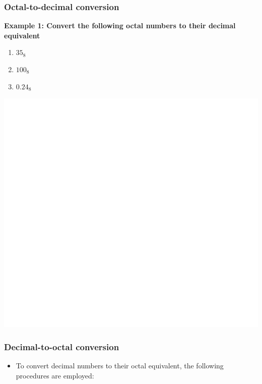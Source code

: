 \documentclass[]{book}
\providecommand{\tightlist}{%
  \setlength{\itemsep}{0pt}\setlength{\parskip}{0pt}}
\begin{document}
\hypertarget{octal-to-decimal-conversion}{%
\subsubsection{Octal-to-decimal conversion}\label{octal-to-decimal-conversion}}

\textbf{Example 1: Convert the following octal numbers to their decimal equivalent}

\begin{enumerate}
\def\labelenumi{(\alph{enumi})}
\tightlist
\item
  \(35_8\)
\item
  \(100_8\)
\item
  \(0.24_8\)
\end{enumerate}

\begin{center}\includegraphics[width=1\linewidth]{figure/NSbox9-1} \end{center}

\hypertarget{decimal-to-octal-conversion}{%
\subsubsection{Decimal-to-octal conversion}\label{decimal-to-octal-conversion}}

\begin{itemize}
\tightlist
\item
  To convert decimal numbers to their octal equivalent, the following procedures are employed:
\end{itemize}
\end{document}
